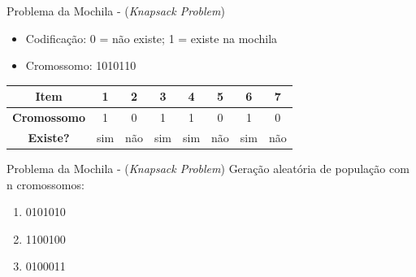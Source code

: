 \documentclass[12pt]{beamer}
\begin{document}
		\begin{frame}{Problema da Mochila - (\textit{Knapsack Problem})}
			\justifying
			\begin{itemize}
				\item Codificação: 0 = não existe; 1 = existe na mochila
				\item Cromossomo: 1010110 \\
			\end{itemize}
			\vspace{1mm}
			\centering
			\begin{tabular}{|c|c|c|c|c|c|c|c|}
				\hline
				\textbf{Item} & \textbf{1} & \textbf{2} & \textbf{3} & \textbf{4} & \textbf{5} & \textbf{6} & \textbf{7} \\
				\hline
				\textbf{Cromossomo} & 1 & 0 & 1 & 1 & 0 & 1 & 0 \\
				\hline
				\textbf{Existe?} & sim & não & sim & sim & não & sim & não \\
				\hline
			\end{tabular}
			 \vspace{2mm}
			
			\begin{itemize}
			\end{itemize}
			
		\end{frame}
		
		\begin{frame}{Problema da Mochila - (\textit{Knapsack Problem})}
			Geração aleatória de população com n cromossomos:
			
			\begin{enumerate}
				\item [a)] 0101010
				\item [b)] 1100100
				\item [c)] 0100011
			\end{enumerate}
		\end{frame}
		
\end{document}
